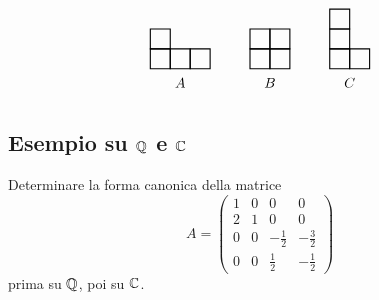 \documentclass[a4paper]{article}
\begin{document}
\begin{radioactive}
\[
    \begin{tikzpicture}[scale=0.5]
        \foreach \x/\h in {0/2,1/1,2/1} {
            \foreach \y in {1,...,\h} {
                \draw[thick] (\x,\y-1) rectangle (\x+1,\y);
            }
        }
        \node at (1.5,-0.7) {\(A\)};

        \begin{scope}[xshift=5cm]
            \foreach \x/\h in {0/2,1/2} {
                \foreach \y in {1,...,\h} {
                    \draw[thick] (\x,\y-1) rectangle (\x+1,\y);
                }
            }
            \node at (1,-0.7) {\(B\)};
        \end{scope}

        \begin{scope}[xshift=9cm]
            \foreach \x/\h in {0/3,1/1} {
                \foreach \y in {1,...,\h} {
                    \draw[thick] (\x,\y-1) rectangle (\x+1,\y);
                }
            }
            \node at (1,-0.7) {\(C\)};
        \end{scope}
    \end{tikzpicture}
\]
\end{radioactive}

\subsection{Esempio su \(\mathbb{Q}\) e \(\mathbb{C}\)}

\begin{radioactive}
\begin{snippetexercise}{}
    Determinare la forma canonica della matrice
    \[
        A=
        \begin{pmatrix}
            1 & 0 & 0 & 0\\
            2 & 1 & 0 & 0\\
            0 & 0 & -\frac{1}{2} & -\frac{3}{2}\\
            0 & 0 & \frac{1}{2} & -\frac{1}{2}
        \end{pmatrix}
    \]
    prima su \(\mathbb{Q}\), poi su \(\mathbb{C}\).
\end{snippetexercise}
\end{radioactive}
\end{document}
